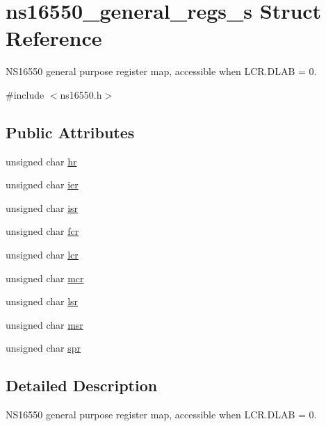 \hypertarget{structns16550__general__regs__s}{\section{ns16550\-\_\-general\-\_\-regs\-\_\-s Struct Reference}
\label{structns16550__general__regs__s}
}


N\-S16550 general purpose register map, accessible when L\-C\-R.\-D\-L\-A\-B = 0.  




{\ttfamily \#include $<$ns16550.\-h$>$}

\subsection*{Public Attributes}
\begin{DoxyCompactItemize}
\item 
unsigned char \hyperlink{structns16550__general__regs__s_a0648ee0f30ad5388707d65e8ff11df40}{hr}
\item 
unsigned char \hyperlink{structns16550__general__regs__s_af3ab39032c2a64d4758bfdd2a6012e4a}{ier}
\item 
unsigned char \hyperlink{structns16550__general__regs__s_afc8dd5bfaf88f0333a5c869b75b523a1}{isr}
\item 
unsigned char \hyperlink{structns16550__general__regs__s_aeca87c04598fd8e717b5514d61a58048}{fcr}
\item 
unsigned char \hyperlink{structns16550__general__regs__s_a4681aada45f52eedb19c8d27bcba4681}{lcr}
\item 
unsigned char \hyperlink{structns16550__general__regs__s_a2299b8cbe364949ee2c41e7d65705721}{mcr}
\item 
unsigned char \hyperlink{structns16550__general__regs__s_abea7b65ca4c70b2c53ba017e972a0900}{lsr}
\item 
unsigned char \hyperlink{structns16550__general__regs__s_af314bb16382283a5bf82ce23bbe96631}{msr}
\item 
unsigned char \hyperlink{structns16550__general__regs__s_a6a65ab1a76ecbf50882ac8595d21bae7}{spr}
\end{DoxyCompactItemize}


\subsection{Detailed Description}
N\-S16550 general purpose register map, accessible when L\-C\-R.\-D\-L\-A\-B = 0. 


